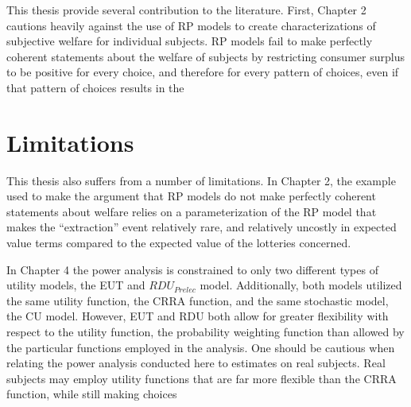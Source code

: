 \documentclass[../main.tex]{subfiles}
\begin{document}
This thesis provide several contribution to the literature.
First, Chapter 2 cautions heavily against the use of RP models to create characterizations of subjective welfare for individual subjects.
RP models fail to make perfectly coherent statements about the welfare of subjects by restricting consumer surplus to be positive for every choice, and therefore for every pattern of choices, even if that pattern of choices results in the


\section{Limitations}
This thesis also suffers from a number of limitations.
In Chapter 2, the example used to make the argument that RP models do not make perfectly coherent statements about welfare relies on a parameterization of the RP model that makes the \enquote{extraction} event relatively rare, and relatively uncostly in expected value terms compared to the expected value of the lotteries concerned.

In Chapter 4 the power analysis is constrained to only two different types of utility models, the EUT and $\mathit{RDU_{Prelec}}$ model.
Additionally, both models utilized the same utility function, the CRRA function, and the same stochastic model, the CU model.
However, EUT and RDU both allow for greater flexibility with respect to the utility function, the probability weighting function than allowed by the particular functions employed in the analysis.
One should be cautious when relating the power analysis conducted here to estimates on real subjects.
Real subjects may employ utility functions that are far more flexible than the CRRA function, while still making choices 




%
\end{document}
